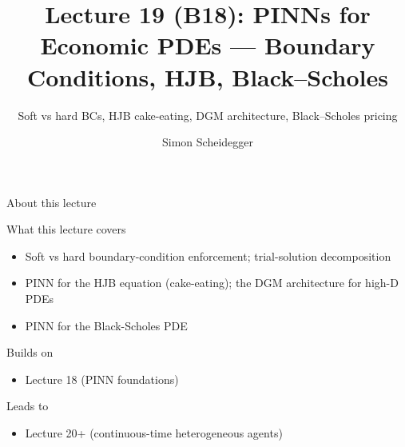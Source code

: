 \documentclass[aspectratio=169,11pt]{beamer}
\title[Lecture 19 (B18)]{Lecture 19 (B18): PINNs for Economic PDEs --- Boundary Conditions, HJB, Black--Scholes}
\subtitle{Soft vs hard BCs, HJB cake-eating, DGM architecture, Black--Scholes pricing}
\author{Simon Scheidegger}
\institute{HEC, University of Lausanne}
\date{}
\begin{document}
\providecommand{\exercisepause}{%
  \tikz[baseline=(X.base)]{\node[fill=darkgreen!80!black, text=white,
  rounded corners=2pt, inner sep=3pt, font=\scriptsize\bfseries](X){PAUSE};}}

{
\begin{frame}
\titlepage
\end{frame}
}

\begin{frame}{About this lecture}
\small
\begin{block}{What this lecture covers}
\begin{itemize}\itemsep2pt
  \item Soft vs hard boundary-condition enforcement; trial-solution decomposition
  \item PINN for the HJB equation (cake-eating); the DGM architecture for high-D PDEs
  \item PINN for the Black-Scholes PDE
\end{itemize}
\end{block}
\begin{block}{Builds on}
\begin{itemize}\itemsep2pt
  \item Lecture 18 (PINN foundations)
\end{itemize}
\end{block}
\begin{block}{Leads to}
\begin{itemize}\itemsep2pt
  \item Lecture 20+ (continuous-time heterogeneous agents)
\end{itemize}
\end{block}
\end{frame}
\end{document}
